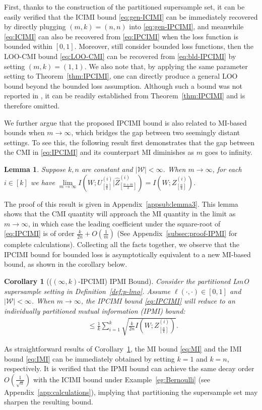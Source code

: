 \documentclass[onecolumn,romanappendices,10pt]{IEEEtran}
\newtheorem{lemma}{Lemma}
\newtheorem{corollary}{Corollary}
\newcommand{\Wcal}{{\mathcal W}}
\DeclareMathOperator{\gen}{\overline{gen}}
\begin{document}
	First, thanks to the construction of the partitioned supersample set, it can be easily verified that the ICIMI bound \eqref{eq:gen-ICIMI} can be immediately recovered by directly plugging $(m, k) = (n, n)$ into \eqref{eq:gen-IPCIMI}, and meanwhile \eqref{eq:ICIMI} can also be recovered from \eqref{eq:IPCIMI} when the loss function is bounded within $[0,1]$. Moreover, still consider bounded loss functions, then the LOO-CMI bound \eqref{eq:LOO-CMI} can be recovered from \eqref{eq:bld-IPCIMI} by setting $(m, k) = (1, 1)$. We also note that, by applying the same parameter setting to Theorem~\ref{thm:IPCIMI}, one can directly produce a general LOO bound beyond the bounded loss assumption. Although such a bound was not reported in \cite{haghifam2022understanding,rammal2022leave}, it can be readily established from Theorem~\ref{thm:IPCIMI} and is therefore omitted. 
	
	We further argue that the proposed IPCIMI bound is also related to MI-based bounds when $m \to \infty$, which bridges the gap between two seemingly distant settings. To see this, the following result first demonstrates that the gap between the CMI in \eqref{eq:IPCIMI} and its counterpart MI diminishes as $m$ goes to infinity.
	\begin{lemma} \label{lem:lim-MI}
		Suppose $k, n$ are constant and $|\Wcal| < \infty$. When $m \to \infty$, for each $i \in [k]$ we have $\lim\limits_{m \to \infty} I\left( W; U^{(i)}_{[\frac{n}{k}]} | \hat{Z}^{(i)}_{[\frac{n+m}{k}]} \right) = I\left( W; Z^{(i)}_{[\frac{n}{k}]} \right)$.
	\end{lemma}
	The proof of this result is given in Appendix~\ref{appsub:lemma3}. This lemma shows that the CMI quantity will approach the MI quantity in the limit as $m \to \infty$, in which case the leading coefficient under the square-root of \eqref{eq:IPCIMI} is of order $\frac{k}{2n} + O(\frac{1}{m})$ (See Appendix~\ref{subsec:proof-IPMI} for complete calculations). Collecting all the facts together, we observe that the IPCIMI bound for bounded loss is asymptotically equivalent to a new MI-based bound, as shown in the corollary below.
	\begin{corollary}[($(\infty, k)$-IPCIMI) IPMI Bound] \label{cor:IPMI}
		Consider the partitioned L$m$O supersample setting in Definition~\ref{def:p-lmo}. Assume $\ell(\cdot, \cdot) \in [0,1]$ and $|\Wcal| < \infty$. When $m \to \infty$, the IPCIMI bound \eqref{eq:IPCIMI} will reduce to an individually partitioned mutual information (IPMI) bound:
		\begin{align}
			\gen \leq \frac{1}{k} \sum_{i=1}^{k} \sqrt{\frac{k}{2n} I\left( W; Z^{(i)}_{[\frac{n}{k}]} \right)}.
			\label{eq:IPMI}
		\end{align}
	\end{corollary}
	As straightforward results of Corollary~\ref{cor:IPMI}, the MI bound \eqref{eq:MI} and the IMI bound \eqref{eq:IMI} can be immediately obtained by setting $k=1$ and $k = n$, respectively. It is verified that the IPMI bound can achieve the same decay order $O(\frac{1}{\sqrt{n}})$ with the ICIMI bound under Example~\ref{eg:Bernoulli} (see Appendix~\ref{app:calculations}), implying that partitioning the supersample set may sharpen the resulting bound.
	
\end{document}
